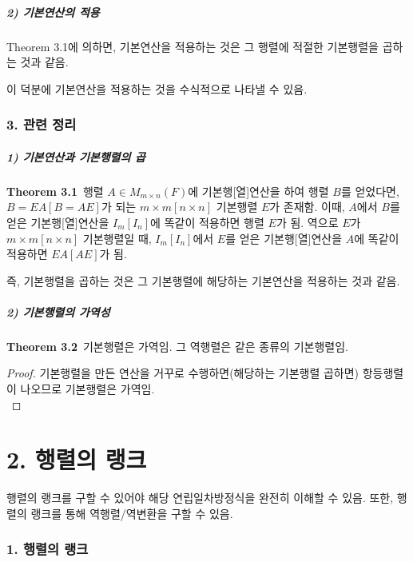 \subsubsection*{2) 기본연산의 적용}
Theorem 3.1에 의하면, 기본연산을 적용하는 것은 그 행렬에 적절한 기본행렬을 곱하는 것과 같음.

이 덕분에 기본연산을 적용하는 것을 수식적으로 나타낼 수 있음.


\section*{3. 관련 정리}
\subsubsection*{1) 기본연산과 기본행렬의 곱}
\textbf{Theorem 3.1}\, 행렬 $A \in M_{m \times n}(F)$에 기본행[열]연산을 하여 행렬 $B$를 얻었다면, $B=EA[B=AE]$가 되는 $m \times m[n \times n]$ 기본행렬 $E$가 존재함. 이때, $A$에서 $B$를 얻은 기본행[열]연산을 $I_m[I_n]$에 똑같이 적용하면 행렬 $E$가 됨. 역으로 $E$가 $m \times m[n \times n]$ 기본행렬일 때, $I_m[I_n]$에서 $E$를 얻은 기본행[열]연산을 $A$에 똑같이 적용하면 $EA[AE]$가 됨.

즉, 기본행렬을 곱하는 것은 그 기본행렬에 해당하는 기본연산을 적용하는 것과 같음.

\subsubsection*{2) 기본행렬의 가역성}
\textbf{Theorem 3.2}\, 기본행렬은 가역임. 그 역행렬은 같은 종류의 기본행렬임.

\begin{proof}
기본행렬을 만든 연산을 거꾸로 수행하면(해당하는 기본행렬 곱하면) 항등행렬이 나오므로 기본행렬은 가역임.\\
\end{proof}


\newpage


\part*{2. 행렬의 랭크}

행렬의 랭크를 구할 수 있어야 해당 연립일차방정식을 완전히 이해할 수 있음. 또한, 행렬의 랭크를 통해 역행렬/역변환을 구할 수 있음.

\section*{1. 행렬의 랭크}
